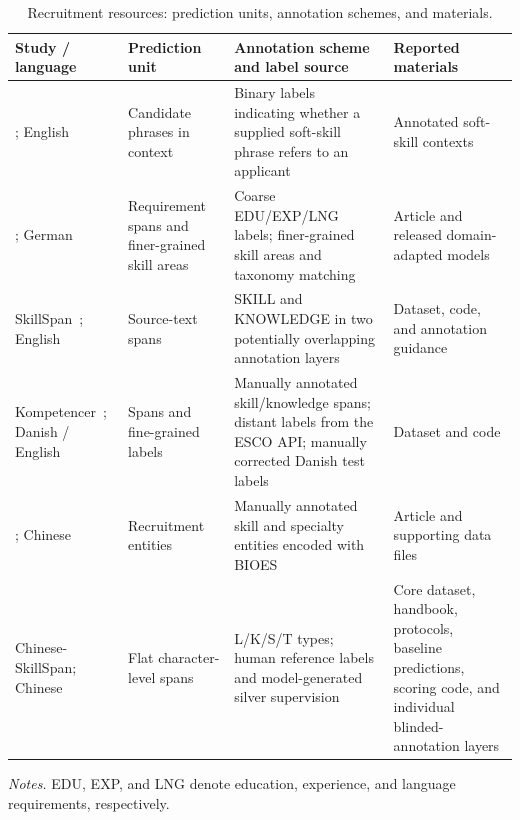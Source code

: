 \documentclass[fleqn,12pt]{wlpeerj}
\begin{document}
\setcounter{table}{0}
\begin{table}[!htbp]
\centering\small
\caption{Recruitment resources: prediction units, annotation schemes, and materials.}
\label{tab:related-span}
\setlength{\tabcolsep}{4pt}\renewcommand{\arraystretch}{1.13}
\begin{tabularx}{\linewidth}{@{}P{.20\linewidth}P{.17\linewidth}P{.34\linewidth}L@{}}
\toprule
Study / language & Prediction unit & Annotation scheme and label source & Reported materials \\
\midrule
\citet{sayfullina2018softskills}; English & Candidate phrases in context & Binary labels indicating whether a supplied soft-skill phrase refers to an applicant & Annotated soft-skill contexts \\
\citet{gnehm2022skills}; German & Requirement spans and finer-grained skill areas & Coarse EDU/EXP/LNG labels; finer-grained skill areas and taxonomy matching & Article and released domain-adapted models \\
SkillSpan~\citep{zhang2022skillspan}; English & Source-text spans & SKILL and KNOWLEDGE in two potentially overlapping annotation layers & Dataset, code, and annotation guidance \\
Kompetencer~\citep{jensen2022kompetencer}; Danish / English & Spans and fine-grained labels & Manually annotated skill/knowledge spans; distant labels from the ESCO API; manually corrected Danish test labels & Dataset and code \\
\citet{cao2021occupational}; Chinese & Recruitment entities & Manually annotated skill and specialty entities encoded with BIOES & Article and supporting data files \\
Chinese-SkillSpan; Chinese & Flat character-level spans & L/K/S/T types; human reference labels and model-generated silver supervision & Core dataset, handbook, protocols, baseline predictions, scoring code, and individual blinded-annotation layers \\
\bottomrule
\end{tabularx}
\par\smallskip
{\footnotesize\RaggedRight\textit{Notes.} EDU, EXP, and LNG denote education, experience, and language requirements, respectively.\par}
\end{table}

\end{document}
